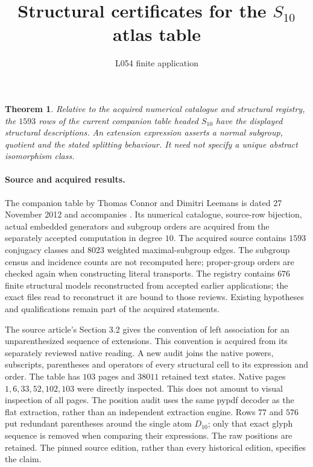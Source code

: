 \documentclass[11pt]{article}
\title{Structural certificates for the $S_{10}$ atlas table}
\author{L054 finite application}\date{}
\newtheorem{theorem}{Theorem}
\begin{document}
\maketitle

\begin{theorem}
Relative to the acquired numerical catalogue and structural registry,
the $1593$ rows of the current companion table headed $S_{10}$ have the
displayed structural descriptions. An extension expression asserts a normal
subgroup, quotient and the stated splitting behaviour. It need not
specify a unique abstract isomorphism class.
\end{theorem}

\paragraph{Source and acquired results.}
The companion table by Thomas Connor and Dimitri Leemans is dated
27 November 2012 and accompanies \cite{atlas}. Its numerical catalogue,
source-row bijection, actual embedded generators and subgroup orders are
acquired from the separately accepted computation in degree $10$.
The acquired source contains $1593$ conjugacy classes and $8023$ weighted
maximal-subgroup edges. The subgroup census and incidence counts are not
recomputed here; proper-group orders are checked again when constructing
literal transports. The registry contains $676$ finite structural models reconstructed
from accepted earlier applications; the exact files read to reconstruct
it are bound to those reviews. Existing hypotheses and qualifications
remain part of the acquired statements.

The source article's Section 3.2 gives the convention of left association
for an unparenthesized sequence of extensions. This convention is acquired
from its separately reviewed native reading. A new audit joins the native
powers, subscripts, parentheses and operators of every structural cell to
its expression and order. The table has $103$ pages and $38011$ retained
text states. Native pages $1,6,33,52,102,103$ were directly inspected.
This does not amount to visual inspection of all pages. The position audit
uses the same pypdf decoder as the flat extraction, rather than an
independent extraction engine. Rows $77$ and $576$ put redundant parentheses
around the single atom $D_{10}$; only that exact glyph sequence is removed
when comparing their expressions. The raw positions are retained. The
pinned source edition, rather than every historical edition, specifies the
claim.
\end{document}
